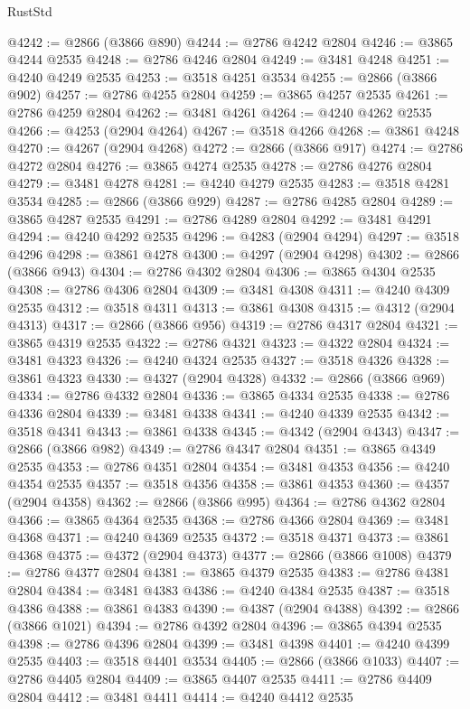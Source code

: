 \begin{lexlean}{RustStd}
\begin{coremodule}
@4242 := @2866 (@3866 @890)
@4244 := @2786 @4242 @2804
@4246 := @3865 @4244 @2535
@4248 := @2786 @4246 @2804
@4249 := @3481 @4248
@4251 := @4240 @4249 @2535
@4253 := @3518 @4251 @3534
@4255 := @2866 (@3866 @902)
@4257 := @2786 @4255 @2804
@4259 := @3865 @4257 @2535
@4261 := @2786 @4259 @2804
@4262 := @3481 @4261
@4264 := @4240 @4262 @2535
@4266 := @4253 (@2904 @4264)
@4267 := @3518 @4266
@4268 := @3861 @4248
@4270 := @4267 (@2904 @4268)
@4272 := @2866 (@3866 @917)
@4274 := @2786 @4272 @2804
@4276 := @3865 @4274 @2535
@4278 := @2786 @4276 @2804
@4279 := @3481 @4278
@4281 := @4240 @4279 @2535
@4283 := @3518 @4281 @3534
@4285 := @2866 (@3866 @929)
@4287 := @2786 @4285 @2804
@4289 := @3865 @4287 @2535
@4291 := @2786 @4289 @2804
@4292 := @3481 @4291
@4294 := @4240 @4292 @2535
@4296 := @4283 (@2904 @4294)
@4297 := @3518 @4296
@4298 := @3861 @4278
@4300 := @4297 (@2904 @4298)
@4302 := @2866 (@3866 @943)
@4304 := @2786 @4302 @2804
@4306 := @3865 @4304 @2535
@4308 := @2786 @4306 @2804
@4309 := @3481 @4308
@4311 := @4240 @4309 @2535
@4312 := @3518 @4311
@4313 := @3861 @4308
@4315 := @4312 (@2904 @4313)
@4317 := @2866 (@3866 @956)
@4319 := @2786 @4317 @2804
@4321 := @3865 @4319 @2535
@4322 := @2786 @4321
@4323 := @4322 @2804
@4324 := @3481 @4323
@4326 := @4240 @4324 @2535
@4327 := @3518 @4326
@4328 := @3861 @4323
@4330 := @4327 (@2904 @4328)
@4332 := @2866 (@3866 @969)
@4334 := @2786 @4332 @2804
@4336 := @3865 @4334 @2535
@4338 := @2786 @4336 @2804
@4339 := @3481 @4338
@4341 := @4240 @4339 @2535
@4342 := @3518 @4341
@4343 := @3861 @4338
@4345 := @4342 (@2904 @4343)
@4347 := @2866 (@3866 @982)
@4349 := @2786 @4347 @2804
@4351 := @3865 @4349 @2535
@4353 := @2786 @4351 @2804
@4354 := @3481 @4353
@4356 := @4240 @4354 @2535
@4357 := @3518 @4356
@4358 := @3861 @4353
@4360 := @4357 (@2904 @4358)
@4362 := @2866 (@3866 @995)
@4364 := @2786 @4362 @2804
@4366 := @3865 @4364 @2535
@4368 := @2786 @4366 @2804
@4369 := @3481 @4368
@4371 := @4240 @4369 @2535
@4372 := @3518 @4371
@4373 := @3861 @4368
@4375 := @4372 (@2904 @4373)
@4377 := @2866 (@3866 @1008)
@4379 := @2786 @4377 @2804
@4381 := @3865 @4379 @2535
@4383 := @2786 @4381 @2804
@4384 := @3481 @4383
@4386 := @4240 @4384 @2535
@4387 := @3518 @4386
@4388 := @3861 @4383
@4390 := @4387 (@2904 @4388)
@4392 := @2866 (@3866 @1021)
@4394 := @2786 @4392 @2804
@4396 := @3865 @4394 @2535
@4398 := @2786 @4396 @2804
@4399 := @3481 @4398
@4401 := @4240 @4399 @2535
@4403 := @3518 @4401 @3534
@4405 := @2866 (@3866 @1033)
@4407 := @2786 @4405 @2804
@4409 := @3865 @4407 @2535
@4411 := @2786 @4409 @2804
@4412 := @3481 @4411
@4414 := @4240 @4412 @2535

\end{coremodule}
\end{lexlean}
